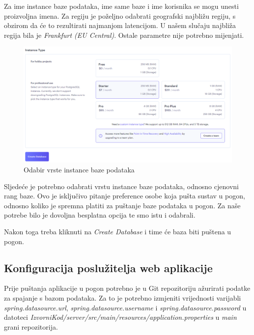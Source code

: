 			Za ime instance baze podataka, ime same baze i ime korisnika se mogu unesti proizvoljna imena. Za regiju je poželjno odabrati geografski najbližu regiju, s obzirom da će to rezultirati najmanjom latencijom. U našem slučaju najbliža regija bila je \textit{Frankfurt (EU Central)}. Ostale parametre nije potrebno mijenjati.
			
			\begin{figure}[H]
				\includegraphics[width=\textwidth]{slike/upute/bazaPlacanje.png} %
				\caption{Odabir vrste instance baze podataka}
				\label{fig:bazaPlacanje} %
			\end{figure}
			
			Sljedeće je potrebno odabrati vrstu instance baze podataka, odnosno cjenovni rang baze. Ovo je isključivo pitanje preference osobe koja pušta sustav u pogon, odnosno koliko je spremna platiti za puštanje baze podataka u pogon. Za naše potrebe bilo je dovoljna besplatna opcija te smo istu i odabrali.
			
			Nakon toga treba kliknuti na \textit{Create Database} i time će baza biti puštena u pogon.
			
			\subsection{Konfiguracija poslužitelja web aplikacije}
			
			Prije puštanja aplikacije u pogon potrebno je u Git repozitoriju ažurirati podatke za spajanje s bazom podataka. Za to je potrebno izmjeniti vrijednosti varijabli \textit{spring.datasource.url}, \textit{spring.datasource.username} i \textit{spring.datasource.password} u datoteci \textit{IzvorniKod/server/src/main/resources/application.properties} u \textit{main} grani repozitorija. 
			
